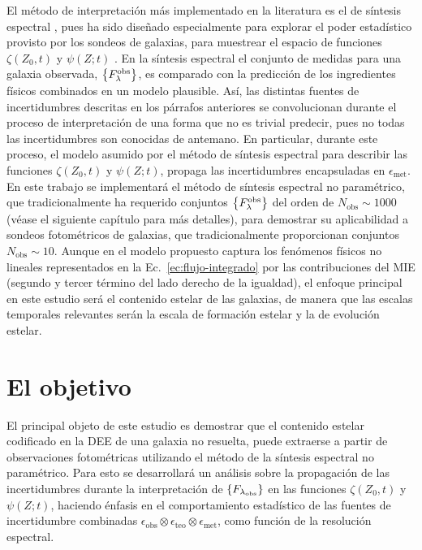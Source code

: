 El método de interpretación más implementado en la literatura es el de síntesis espectral
\citep[pero véase \eg,][]{Chen2012}, pues ha sido diseñado especialmente para explorar el poder
estadístico provisto por los sondeos de galaxias, para muestrear el espacio de funciones
$\zeta(Z_0,t)$ y $\psi(Z;t)$ \citep[\eg,][]{Heavens2000, Kauffmann2003}. En la síntesis espectral el
conjunto de medidas para una galaxia observada, $\set{\sedt[F]{obs}}$, es comparado con la
predicción de los ingredientes físicos combinados en un modelo plausible. Así, las distintas fuentes
de incertidumbres descritas en los párrafos anteriores se convolucionan durante el proceso de
interpretación de una forma que no es trivial predecir, pues no todas las incertidumbres son
conocidas de antemano. En particular, durante este proceso, el modelo asumido por el método de
síntesis espectral para describir las funciones $\zeta(Z_0,t)$ y $\psi(Z;t)$, propaga las
incertidumbres encapsuladas en $\epsilon_\text{met}$. En este trabajo se implementará el método de
síntesis espectral no paramétrico, que tradicionalmente ha requerido conjuntos $\set{\sedt[F]{obs}}$
del orden de $N_\text{obs}\sim1000$ (véase el siguiente capítulo para más detalles), para demostrar
su aplicabilidad a sondeos fotométricos de galaxias, que tradicionalmente proporcionan conjuntos
$N_\text{obs}\sim10$. Aunque en el modelo propuesto captura los fenómenos físicos no lineales
representados en la Ec.~\eqref{ec:flujo-integrado} por las contribuciones del MIE (segundo y tercer
término del lado derecho de la igualdad), el enfoque principal en este estudio será el contenido
estelar de las galaxias, de manera que las escalas temporales relevantes serán la escala de
formación estelar y la de evolución estelar.

\section{El objetivo}

El principal objeto de este estudio es demostrar que el contenido estelar codificado en la DEE de
una galaxia no resuelta, puede extraerse a partir de observaciones fotométricas utilizando el método
de la síntesis espectral no paramétrico. Para esto se desarrollará un análisis sobre la propagación
de las incertidumbres durante la interpretación de $\set{F_{\lambda_\text{obs}}}$ en las funciones
$\zeta(Z_0,t)$ y $\psi(Z;t)$, haciendo énfasis en el comportamiento estadístico de las fuentes de
incertidumbre combinadas $\epsilon_\text{obs} \otimes \epsilon_\text{teo} \otimes
\epsilon_\text{met}$, como función de la resolución espectral.

